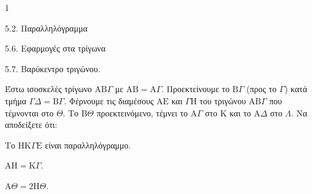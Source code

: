 \begin{ylh}{1}
    \item 5.2. Παραλληλόγραμμα
    \item 5.6. Εφαρμογές στα τρίγωνα
    \item 5.7. Βαρύκεντρο τριγώνου.
\end{ylh}
Έστω ισοσκελές τρίγωνο $\mathrm{A}\mathrm{B}\Gamma$ με $\mathrm{A}\mathrm{B} = \mathrm{A}\Gamma$. Προεκτείνουμε το $\mathrm{B}\Gamma$ (προς το $\Gamma$) κατά τμήμα $\Gamma\Delta = \mathrm{B}\Gamma$. Φέρνουμε τις διαμέσους $\mathrm{A}\mathrm{E}$ και $\Gamma\mathrm{H}$ του τριγώνου $\mathrm{A}\mathrm{B}\Gamma$ που τέμνονται στο $\Theta$. Το $\mathrm{B}\Theta$ προεκτεινόμενο, τέμνει το $\mathrm{A}\Gamma$ στο $\mathrm{K}$ και το $\mathrm{A}\Delta$ στο $\Lambda$.
Να αποδείξετε ότι:
\begin{alist}
    \item Το $\mathrm{H}\mathrm{K}\Gamma\mathrm{E}$ είναι παραλληλόγραμμο. 
    \item $\mathrm{A}\mathrm{H} = \mathrm{K}\Gamma$. 
    \item $\mathrm{A}\Theta = 2\mathrm{H}\Theta$. 
\end{alist}
